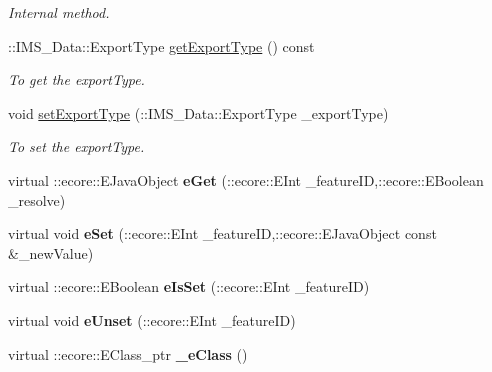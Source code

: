\begin{DoxyCompactItemize}
\begin{DoxyCompactList}\small\item\em Internal method. \item\end{DoxyCompactList}\item 
::IMS\_\-Data::ExportType \hyperlink{classIMS__Data_1_1ExportOp_a8ba54898e92090b9fd8d8e4af69dea9e}{getExportType} () const 
\begin{DoxyCompactList}\small\item\em To get the exportType. \item\end{DoxyCompactList}\item 
void \hyperlink{classIMS__Data_1_1ExportOp_ae5c53ded5e12e043b230b16ba79096d6}{setExportType} (::IMS\_\-Data::ExportType \_\-exportType)
\begin{DoxyCompactList}\small\item\em To set the exportType. \item\end{DoxyCompactList}\item 
\hypertarget{classIMS__Data_1_1ExportOp_a12ad88bf6e51a9a481f0dd7010ea2855}{
virtual ::ecore::EJavaObject {\bfseries eGet} (::ecore::EInt \_\-featureID,::ecore::EBoolean \_\-resolve)}
\label{classIMS__Data_1_1ExportOp_a12ad88bf6e51a9a481f0dd7010ea2855}

\item 
\hypertarget{classIMS__Data_1_1ExportOp_a5fa8158faf244311112d820844a1cd19}{
virtual void {\bfseries eSet} (::ecore::EInt \_\-featureID,::ecore::EJavaObject const \&\_\-newValue)}
\label{classIMS__Data_1_1ExportOp_a5fa8158faf244311112d820844a1cd19}

\item 
\hypertarget{classIMS__Data_1_1ExportOp_a8f08d6c6825a95304b9f56104d8f1100}{
virtual ::ecore::EBoolean {\bfseries eIsSet} (::ecore::EInt \_\-featureID)}
\label{classIMS__Data_1_1ExportOp_a8f08d6c6825a95304b9f56104d8f1100}

\item 
\hypertarget{classIMS__Data_1_1ExportOp_acadc142191838496cd3433c0951cea4c}{
virtual void {\bfseries eUnset} (::ecore::EInt \_\-featureID)}
\label{classIMS__Data_1_1ExportOp_acadc142191838496cd3433c0951cea4c}

\item 
\hypertarget{classIMS__Data_1_1ExportOp_aee09083a8a8731e9631a84072f715be2}{
virtual ::ecore::EClass\_\-ptr {\bfseries \_\-eClass} ()}
\label{classIMS__Data_1_1ExportOp_aee09083a8a8731e9631a84072f715be2}

\end{DoxyCompactItemize}
